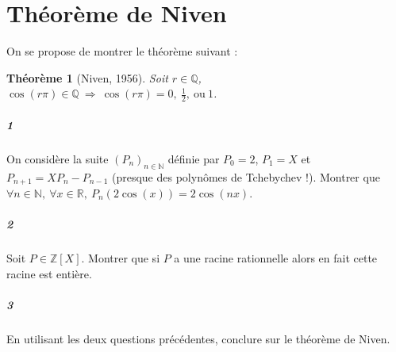 \documentclass[10pt,a4paper]{article}
\newtheorem{thm}{Théorème}
\begin{document}
\section{Théorème de Niven}
On se propose de montrer le théorème suivant :
\begin{thm}[Niven, 1956]
Soit $r \in \mathbb{Q}$, $\cos(r \pi) \in \mathbb{Q} \ \Rightarrow \ \cos(r\pi)=0, \ \frac{1}{2}, \ \text{ou} \ 1$. 
\end{thm}
\subparagraph{1}On considère la suite $(P_n)_{n \in \mathbb{N}}$ définie par $P_0 = 2$, $P_1=X$ et $P_{n+1}=XP_n-P_{n-1}$ (presque des polynômes de Tchebychev !). Montrer que $\forall n \in \mathbb{N}, \ \forall x \in \mathbb{R}, \ P_n(2\cos(x))=2\cos(nx)$.
\subparagraph{2}Soit $P \in \mathbb{Z}[X]$. Montrer que si $P$ a une racine rationnelle alors en fait cette racine est entière.
\subparagraph{3}En utilisant les deux questions précédentes, conclure sur le théorème de Niven.
\end{document}
